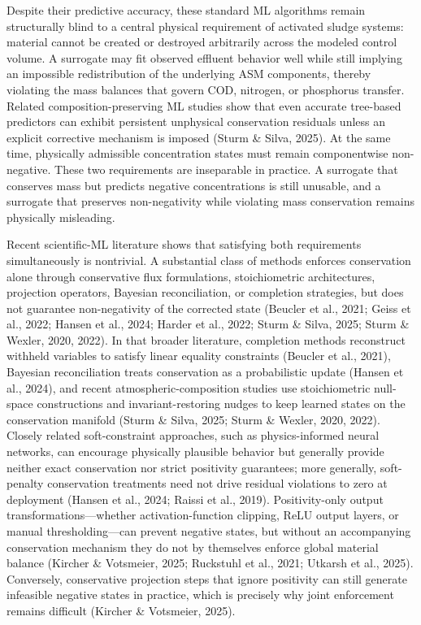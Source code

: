 \documentclass[a4paper,fleqn]{cas-sc}
\newenvironment{revblock}{}{}
\begin{document}
\begin{revblock}
Despite their predictive accuracy, these standard ML algorithms remain structurally blind to a central physical requirement of activated sludge systems: material cannot be created or destroyed arbitrarily across the modeled control volume. A surrogate may fit observed effluent behavior well while still implying an impossible redistribution of the underlying ASM components, thereby violating the mass balances that govern COD, nitrogen, or phosphorus transfer. Related composition-preserving ML studies show that even accurate tree-based predictors can exhibit persistent unphysical conservation residuals unless an explicit corrective mechanism is imposed (Sturm \& Silva, 2025). At the same time, physically admissible concentration states must remain componentwise non-negative. These two requirements are inseparable in practice. A surrogate that conserves mass but predicts negative concentrations is still unusable, and a surrogate that preserves non-negativity while violating mass conservation remains physically misleading.

Recent scientific-ML literature shows that satisfying both requirements simultaneously is nontrivial. A substantial class of methods enforces conservation alone through conservative flux formulations, stoichiometric architectures, projection operators, Bayesian reconciliation, or completion strategies, but does not guarantee non-negativity of the corrected state (Beucler et al., 2021; Geiss et al., 2022; Hansen et al., 2024; Harder et al., 2022; Sturm \& Silva, 2025; Sturm \& Wexler, 2020, 2022). In that broader literature, completion methods reconstruct withheld variables to satisfy linear equality constraints (Beucler et al., 2021), Bayesian reconciliation treats conservation as a probabilistic update (Hansen et al., 2024), and recent atmospheric-composition studies use stoichiometric null-space constructions and invariant-restoring nudges to keep learned states on the conservation manifold (Sturm \& Silva, 2025; Sturm \& Wexler, 2020, 2022). Closely related soft-constraint approaches, such as physics-informed neural networks, can encourage physically plausible behavior but generally provide neither exact conservation nor strict positivity guarantees; more generally, soft-penalty conservation treatments need not drive residual violations to zero at deployment (Hansen et al., 2024; Raissi et al., 2019). Positivity-only output transformations---whether activation-function clipping, ReLU output layers, or manual thresholding---can prevent negative states, but without an accompanying conservation mechanism they do not by themselves enforce global material balance (Kircher \& Votsmeier, 2025; Ruckstuhl et al., 2021; Utkarsh et al., 2025). Conversely, conservative projection steps that ignore positivity can still generate infeasible negative states in practice, which is precisely why joint enforcement remains difficult (Kircher \& Votsmeier, 2025).


\end{revblock}
\end{document}
